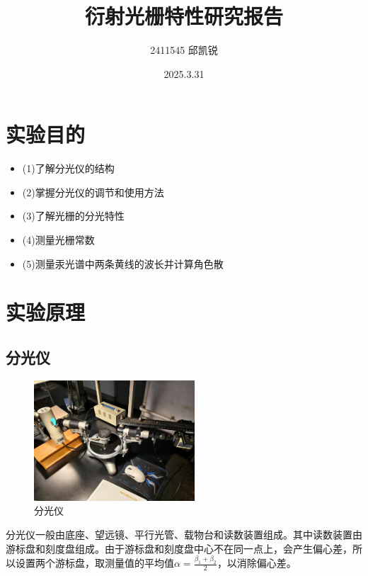 \documentclass{article}
\title{衍射光栅特性研究报告}
\author{2411545 邱凯锐}
\date{2025.3.31}
\begin{document}
\maketitle
\section{实验目的}
\begin{itemize}
    \item (1)了解分光仪的结构
    \item (2)掌握分光仪的调节和使用方法
    \item (3)了解光栅的分光特性
    \item (4)测量光栅常数
    \item (5)测量汞光谱中两条黄线的波长并计算角色散
\end{itemize}
\section{实验原理}
\subsection{分光仪}
\begin{figure}[h]
    \centering
    \includegraphics[width=6cm]{3.1.jpg}
    \caption{分光仪}
\end{figure}
分光仪一般由底座、望远镜、平行光管、载物台和读数装置组成。其中读数装置由游标盘和刻度盘组成。由于游标盘和刻度盘中心不在同一点上，会产生偏心差，所以设置两个游标盘，取测量值的平均值$\alpha =\frac{\beta_1+\beta_2}{2}$，以消除偏心差。
\end{document}
